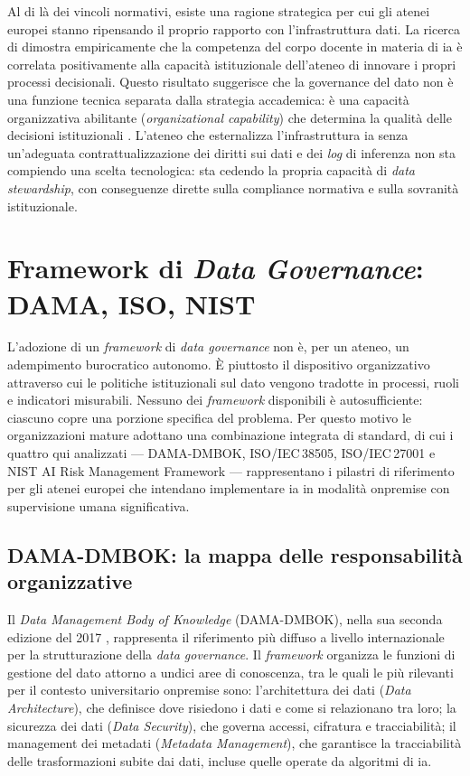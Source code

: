Al di là dei vincoli normativi, esiste una ragione strategica per cui gli atenei europei
stanno ripensando il proprio rapporto con l'infrastruttura dati. La ricerca di
\textcite{NunezCanal2026} dimostra empiricamente che la competenza del corpo docente in
materia di \gls{ia} è correlata positivamente alla capacità istituzionale dell'ateneo di
innovare i propri processi decisionali. Questo risultato suggerisce che la
governance del dato non è una funzione tecnica separata dalla strategia
accademica: è una capacità organizzativa abilitante (\textit{organizational capability})
che determina la qualità delle decisioni istituzionali \parencite{Dabbous2026AIReadiness}.
L'ateneo che esternalizza l'infrastruttura \gls{ia} senza un'adeguata contrattualizzazione dei
diritti sui dati e dei \textit{log} di inferenza non sta compiendo una scelta
tecnologica: sta cedendo la propria capacità di \textit{data stewardship}, con
conseguenze dirette sulla compliance normativa e sulla sovranità istituzionale.

\section{Framework di \textit{Data Governance}: DAMA, ISO, NIST}
\label{sec:framework-governance}

L'adozione di un \textit{framework} di \textit{data governance} non è, per un ateneo, un
adempimento burocratico autonomo. È piuttosto il dispositivo organizzativo attraverso cui
le politiche istituzionali sul dato vengono tradotte in processi, ruoli e indicatori
misurabili. Nessuno dei \textit{framework} disponibili è autosufficiente: ciascuno copre
una porzione specifica del problema. Per questo motivo le organizzazioni mature adottano
una combinazione integrata di standard, di cui i quattro qui analizzati --- DAMA-DMBOK,
ISO/IEC\,38505, ISO/IEC\,27001 e NIST AI Risk Management Framework --- rappresentano i
pilastri di riferimento per gli atenei europei che intendano implementare \gls{ia} in modalità
\gls{onpremise} con supervisione umana significativa.

\subsection{DAMA-DMBOK: la mappa delle responsabilità organizzative}

Il \textit{Data Management Body of Knowledge} (DAMA-DMBOK), nella sua seconda edizione del
2017 \parencite{DAMA_DMBOK}, rappresenta il riferimento più diffuso a livello
internazionale per la strutturazione della \textit{data governance}. Il \textit{framework}
organizza le funzioni di gestione del dato attorno a undici aree di conoscenza, tra le
quali le più rilevanti per il contesto universitario \gls{onpremise} sono:
l'architettura dei dati (\textit{Data Architecture}), che definisce dove
risiedono i dati e come si relazionano tra loro; la sicurezza dei dati
(\textit{Data Security}), che governa accessi, cifratura e tracciabilità; il
management dei metadati (\textit{Metadata Management}), che garantisce la
tracciabilità delle trasformazioni subite dai dati, incluse quelle operate da algoritmi
di \gls{ia}.

